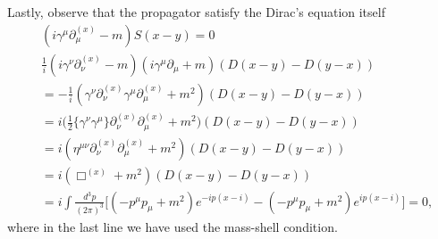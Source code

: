 Lastly, observe that the propagator satisfy the Dirac's equation itself
\begin{align*}
    &(i\gamma^\mu\partial_\mu^{(x)}-m)S(x-y)=0\\&
    \frac{1}{i}(i\gamma^\nu\partial_\nu^{(x)}-m)(i\gamma^\mu\partial_\mu+m)(D(x-y)-D(y-x))\\&=-\frac{1}{i}(\gamma^\nu\partial_\nu^{(x)}\gamma^\mu\partial_\mu^{(x)}+m^2)(D(x-y)-D(y-x))\\&=i\bigg(\frac{1}{2}\{\gamma^\nu\gamma^\mu\}\partial_\nu^{(x)}\partial_\mu^{(x)}+m^2\bigg)(D(x-y)-D(y-x))\\&=i(\eta^{\mu\nu}\partial_\nu^{(x)}\partial_\mu^{(x)}+m^2)(D(x-y)-D(y-x))\\&=i(\Box^{(x)}+m^2)(D(x-y)-D(y-x))\\&=i\int\frac{d^3p}{(2\pi)^3}\bigg[(-p^\mu p_\mu+m^2)e^{-ip(x-i)}-(-p^\mu p_\mu+m^2)e^{ip(x-i)}\bigg]=0,
\end{align*}
where in the last line we have used the mass-shell condition.